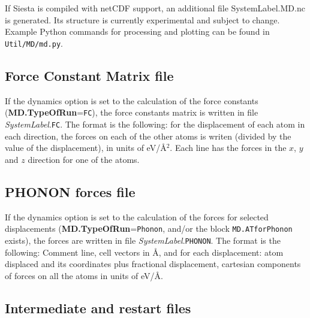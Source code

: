 \documentclass[11pt]{article}
\begin{document}
If {\sc Siesta} is compiled with netCDF support, an additional file
SystemLabel.MD.nc is generated. Its structure is currently
experimental and subject to change. Example Python commands for
processing and plotting can be found in {\tt
Util/MD/md.py}.


\subsection{Force Constant Matrix file}

If the dynamics option is set to the calculation 
of the force constants ({\bf MD.TypeOfRun}={\tt FC}),
the force constants matrix is written in file {\it SystemLabel}.{\tt FC}.
The format is the following: for the displacement of
each atom in each direction, the forces on each of the other
atoms is writen (divided by the value of the displacement),
in units of eV/\AA$^2$. Each line has the forces in the $x$, $y$
and $z$ direction for one of the atoms.

\subsection{PHONON forces file}

If the dynamics option is set to the calculation of the forces for
selected displacements ({\bf MD.TypeOfRun}={\tt Phonon}, and/or the
block {\tt MD.ATforPhonon} exists), the forces
are written in file {\it SystemLabel}.{\tt PHONON}.  The format is the
following: Comment line, cell vectors in {\AA}, and for each
displacement: atom displaced and its coordinates plus fractional
displacement, cartesian components of forces on all the atoms in units
of eV/\AA. 


\subsection{Intermediate and restart files}
\end{document}
